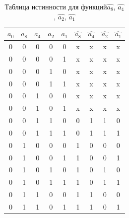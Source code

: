 \documentclass[a4paper,14pt]{article}
\begin{document}
\begin{table}[H]
	\centering
	\caption{\label{tab:dvNeg} Таблица истинности для функций$\widehat{a_8}$, $\widehat{a_4}$, $\widehat{a_2}$, $\widehat{a_1}$}
	\begin{tabular}{|c|c|c|c|c|c|c|c|c|}
		\hline
		$a_0$ & $a_8$ & $a_4$ & $a_2$ & $a_1$ & $\widehat{a_8}$ & $\widehat{a_4}$ & $\widehat{a_2}$ & $\widehat{a_1}$ \\ \hline
		0     & 0     & 0     & 0     & 0     & x               & x               & x               & x               \\ \hline
		0     & 0     & 0     & 0     & 1     & x               & x               & x               & x               \\ \hline
		0     & 0     & 0     & 1     & 0     & x               & x               & x               & x               \\ \hline
		0     & 0     & 0     & 1     & 1     & x               & x               & x               & x               \\ \hline
		0     & 0     & 1     & 0     & 0     & x               & x               & x               & x               \\ \hline
		0     & 0     & 1     & 0     & 1     & x               & x               & x               & x               \\ \hline
		0     & 0     & 1     & 1     & 0     & 0               & 1               & 1               & 0               \\ \hline
		0     & 0     & 1     & 1     & 1     & 0               & 1               & 1               & 1               \\ \hline
		0     & 1     & 0     & 0     & 0     & 1               & 0               & 0               & 0               \\ \hline
		0     & 1     & 0     & 0     & 1     & 1               & 0               & 0               & 1               \\ \hline
		0     & 1     & 0     & 1     & 0     & 1               & 0               & 1               & 0               \\ \hline
		0     & 1     & 0     & 1     & 1     & 1               & 0               & 1               & 1               \\ \hline
		0     & 1     & 1     & 0     & 0     & 1               & 1               & 0               & 0               \\ \hline
		0     & 1     & 1     & 0     & 1     & 1               & 1               & 0               & 1               \\ \hline

\end{tabular}
\end{table}
\end{document}

